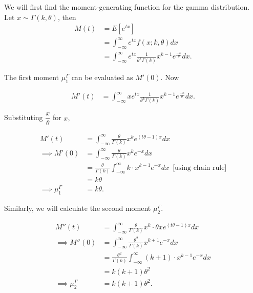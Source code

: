
We will first find the moment-generating function for the gamma distribution. Let
$x\sim \Gamma(k, \theta)$, then 
\begin{equation*}
    \begin{aligned}
        M(t) &= E[e^{tx}] \\
        &= \int_{-\infty}^{\infty}e^{tx}f(x; k, \theta)dx \\
        &= \int_{-\infty}^{\infty}e^{tx}
        \frac{1}{\theta^k\Gamma(k)}x^{k-1}e^{\frac{-x}{\theta}}dx.
    \end{aligned}
\end{equation*}

The first moment $\mu_1^{\Gamma}$ can be evaluated as $M'(0)$. Now

\begin{equation*}
    \begin{aligned}
        M'(t) &= \int_{-\infty}^{\infty}xe^{tx}
        \frac{1}{\theta^k\Gamma(k)}x^{k-1}e^{\frac{-x}{\theta}}dx.
    \end{aligned}
\end{equation*}

Substituting $\dfrac{x}{\theta}$ for $x$,

\begin{equation*}
    \begin{aligned}
        M'(t) &= \int_{-\infty}^{\infty}
        \frac{\theta}{\Gamma(k)}x^ke^{(t\theta-1)x}dx \\
        \implies M'(0) &= \int_{-\infty}^{\infty}
        \frac{\theta}{\Gamma(k)}x^ke^{-x}dx \\
        &= \frac{\theta}{\Gamma(k)}\int_{-\infty}^{\infty}k\cdot
        x^{k-1}e^{-x}dx \, \text{\ [using chain rule]}\\
        &= k\theta \\
        \implies \mu_1^{\Gamma} &= k\theta.
    \end{aligned}
\end{equation*}

Similarly, we will calculate the second moment $\mu_2^{\Gamma}$.

\begin{equation*}
    \begin{aligned}
        M''(t) &= \int_{-\infty}^{\infty}
        \frac{\theta}{\Gamma(k)}x^k\cdot \theta xe^{(t\theta-1)x}dx \\
        \implies M''(0) &= \int_{-\infty}^{\infty}
        \frac{\theta^2}{\Gamma(k)}x^{k+1}e^{-x}dx \\
        &= \frac{\theta^2}{\Gamma(k)}\int_{-\infty}^{\infty}(k+1)\cdot
        x^{k-1}e^{-x}dx \\
        &= k(k+1)\theta^2 \\
        \implies \mu_2^{\Gamma} &= k(k+1)\theta^2.
    \end{aligned}
\end{equation*}

